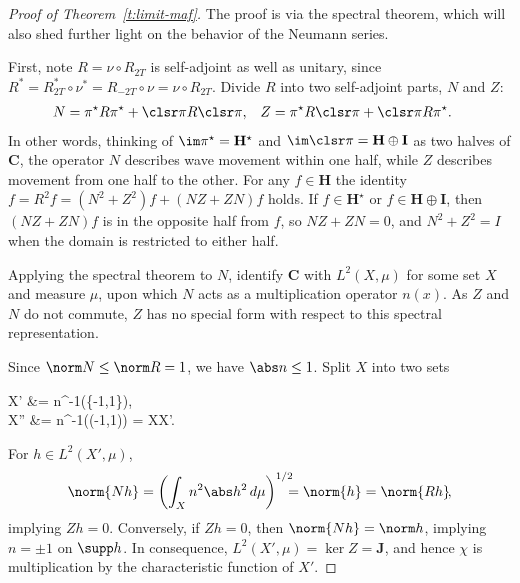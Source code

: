 \documentclass[10pt]{article}
\theoremstyle{plain}
\theoremstyle{definition}
\theoremstyle{remark}
\numberwithin{theorem}{section}
\numberwithin{example}{section}
\numberwithin{equation}{section}
\numberwithin{figure}{section}
\begin{document}
\begin{proof}[Proof of Theorem~\ref{t:limit-maf}]
The proof is via the spectral theorem, which will also shed further light on the behavior of the Neumann series.

First, note $R=\nu\circ R_{2T}$ is self-adjoint as well as unitary, since $R^*=R_{2T}^*\circ\nu^*=R_{-2T}\circ\nu=\nu\circ R_{2T}$. Divide $R$ into two self-adjoint parts, $N$ and $Z$:
%
%
\begin{align}
	N &= \pi^\star R\pi^\star + \clsr\pi R\clsr\pi,
	&
	Z &= \pi^\star R\clsr\pi + \clsr\pi R\pi^\star.
\end{align}
%
%
In other words, thinking of $\im\pi^\star=\mathbf H^\star$ and $\im\clsr\pi=\mathbf H\oplus\mathbf I$ as two halves of $\mathbf C$, the operator $N$ describes wave movement within one half, while $Z$ describes movement from one half to the other. For any $f\in\mathbf H$ the identity $f = R^2f = (N^2+Z^2)f + (NZ+ZN)f$ holds. If $f\in\mathbf H^\star$ or $f\in\mathbf H\oplus\mathbf I$, then $(NZ+ZN)f$ is in the opposite half from $f$, so $NZ+ZN=0$, and $N^2+Z^2=I$ when the domain is restricted to either half.

Applying the spectral theorem to $N$, identify $\mathbf C$ with $L^2(X,\mu)$ for some set $X$ and measure $\mu$, upon which $N$ acts as a multiplication operator $n(x)$. As $Z$ and $N$ do not commute, $Z$ has no special form with respect to this spectral representation.

Since $\norm N\leq \norm R=1$, we have $\abs n\leq 1$. Split $X$ into two sets
\begin{nalign}
	X'	&=	n^{-1}(\{-1,1\}),			\\
	X''	&=	n^{-1}((-1,1)) = X\setminus X'.
\end{nalign}
%
%
For $h\in L^2(X',\mu)$,
%
\begin{equation}
	\norm{Nh}=\left(\int_X n^2\abs h^2\,d\mu \right)^{\mathrlap{1/2}} \;\; = \norm{h}=\norm{Rh}\!,
\end{equation}
%
implying $Zh=0$. Conversely, if $Zh=0$, then $\norm{Nh}=\norm h$, implying $n=\pm 1$ on $\supp h$. In consequence, $L^2(X',\mu)=\ker Z=\mathbf J$, and hence $\chi$ is multiplication by the characteristic function of $X'$.


\end{proof}
\end{document}
